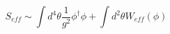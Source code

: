 \begin{equation}
S_{eff} \sim \int d^4\theta \frac{1}{ g^2 }
\phi^\dagger\phi+\int d^2\theta W_{eff}(\phi)
\end{equation}

